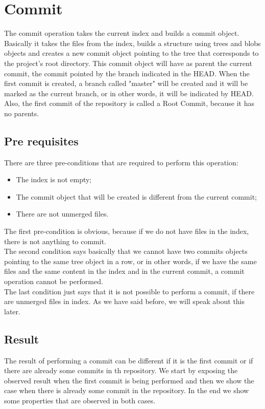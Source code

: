 \section{Commit}
The commit operation takes the current index and builds a commit
object. Basically it takes the files from the index, builds a
structure using trees and blobs objects and creates a new commit
object pointing to the tree that corresponds to the project's root
directory. This commit object will have as parent the current commit,
the commit pointed by the branch indicated in the HEAD.
When the first commit is created, a branch called "master" will be created
and it will be marked as the current branch, or in other words, it
will be indicated by HEAD. Also, the first commit of the repository
is called a Root Commit, because it has no parents.

\subsection{Pre requisites}
There are three pre-conditions that are required to perform this
operation:
\begin{itemize}
   \item The index is not empty;
   \item The commit object that will be created is different from the
   current commit;
   \item There are not unmerged files.
\end{itemize}
The first pre-condition is obvious, because if we do not have files in
the index, there is not anything to commit.\\

The second condition says basically
that we cannot have two commits objects pointing to the same
tree object in a row, or in other words, if we have the same files and
the same content in the index and in the current commit, a commit
operation cannot be performed. \\

The last condition just says that it is not possible to perform a
commit, if there are unmerged files in index. As we have said before,
we will speak about this later.

\subsection{Result}
The result of performing a commit can be different if it is the first
commit or if there are already some commits in th repository. 
We start by exposing the observed result when the first commit is
being performed and then we show the case when there is already some
commit in the repository. In the end we show some properties that are
observed in both cases.\\

